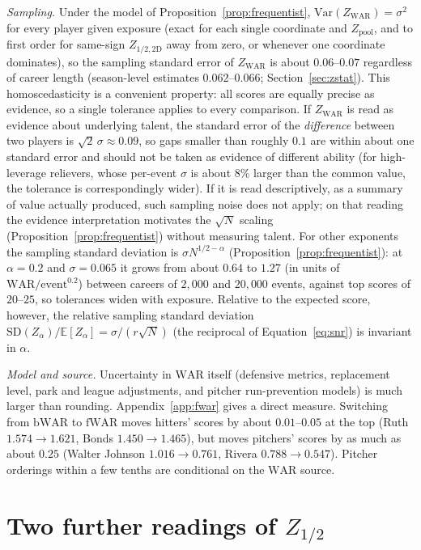 \documentclass[11pt,letterpaper]{article}
\theoremstyle{plain}
\theoremstyle{definition}
\theoremstyle{remark}
\newcommand{\WAR}{\mathrm{WAR}}
\newcommand{\ZWAR}{Z_{\WAR}}
\newcommand{\Zpool}{Z_{\mathrm{pool}}}
\newcommand{\SD}{\mathrm{SD}}
\newcommand{\Var}{\mathrm{Var}}
\newcommand{\E}{\mathbb{E}}
\begin{document}
\emph{Sampling.} Under the model of Proposition~\ref{prop:frequentist}, $\Var(\ZWAR) = \sigma^2$ for every player given exposure (exact for each single coordinate and $\Zpool$, and to first order for same-sign $Z_{1/2,\mathrm{2D}}$ away from zero, or whenever one coordinate dominates), so the sampling standard error of $\ZWAR$ is about $0.06$--$0.07$ regardless of career length (season-level estimates $0.062$--$0.066$; Section~\ref{sec:zstat}). This homoscedasticity is a convenient property: all scores are equally precise as evidence, so a single tolerance applies to every comparison. If $\ZWAR$ is read as evidence about underlying talent, the standard error of the \emph{difference} between two players is $\sqrt2\,\sigma \approx 0.09$, so gaps smaller than roughly $0.1$ are within about one standard error and should not be taken as evidence of different ability (for high-leverage relievers, whose per-event $\sigma$ is about $8\%$ larger than the common value, the tolerance is correspondingly wider). If it is read descriptively, as a summary of value actually produced, such sampling noise does not apply; on that reading the evidence interpretation motivates the $\sqrt N$ scaling (Proposition~\ref{prop:frequentist}) without measuring talent. For other exponents the sampling standard deviation is $\sigma N^{1/2-\alpha}$ (Proposition~\ref{prop:frequentist}): at $\alpha = 0.2$ and $\sigma = 0.065$ it grows from about $0.64$ to $1.27$ (in units of $\WAR/\text{event}^{0.2}$) between careers of $2{,}000$ and $20{,}000$ events, against top scores of $20$--$25$, so tolerances widen with exposure. Relative to the expected score, however, the relative sampling standard deviation $\SD(Z_\alpha)/\E[Z_\alpha] = \sigma/(r\sqrt N)$ (the reciprocal of Equation~\eqref{eq:snr}) is invariant in $\alpha$.

\emph{Model and source.} Uncertainty in $\WAR$ itself (defensive metrics, replacement level, park and league adjustments, and pitcher run-prevention models) is much larger than rounding. Appendix~\ref{app:fwar} gives a direct measure. Switching from $\mathrm{bWAR}$ to $\mathrm{fWAR}$ moves hitters' scores by about $0.01$--$0.05$ at the top (Ruth $1.574 \to 1.621$, Bonds $1.450 \to 1.465$), but moves pitchers' scores by as much as about $0.25$ (Walter Johnson $1.016 \to 0.761$, Rivera $0.788 \to 0.547$). Pitcher orderings within a few tenths are conditional on the $\WAR$ source.

\section{Two further readings of \texorpdfstring{$Z_{1/2}$}{Z\_1/2}}
\label{app:interp}
\end{document}
